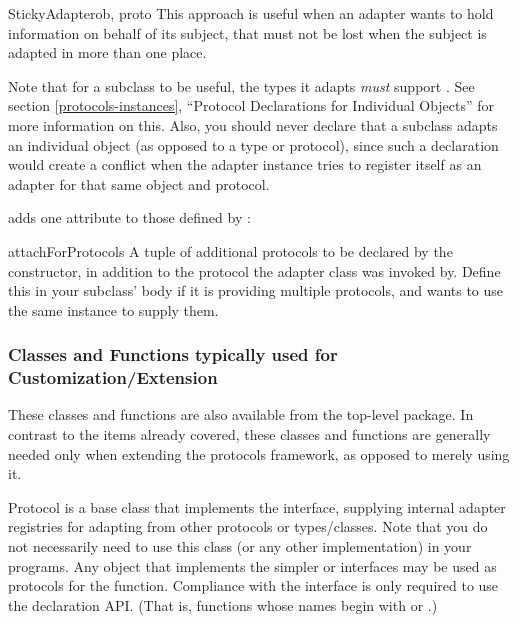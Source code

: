 \begin{verbatim%
}
\begin{verbatim%
}
\begin{verbatim%
}
\begin{verbatim%
}
\begin{verbatim%
}
\begin{verbatim%
}
\begin{classdesc}{StickyAdapter}{ob, proto}
This approach is useful when an adapter wants to hold information on behalf of
its subject, that must not be lost when the subject is adapted in
more than one place.

Note that for a  subclass to be useful, the types it
adapts \emph{must} support .  See section
\ref{protocols-instances}, ``Protocol Declarations for Individual Objects'' for
more information on this.  Also, you should never declare that a
 subclass adapts an individual object (as opposed to a
type or protocol), since such a declaration would create a conflict when the
adapter instance tries to register itself as an adapter for that same object
and protocol.

 adds one attribute to those defined by :

\begin{memberdesc}{attachForProtocols}
A tuple of additional protocols to be declared by the constructor, in
addition to the protocol the adapter class was invoked by.  Define this in
your subclass' body if it is providing multiple protocols, and wants to
use the same instance to supply them.
\end{memberdesc}

\end{classdesc}









\newpage
\subsubsection{Classes and Functions typically used for Customization/Extension}

These classes and functions are also available from the top-level
 package.  In contrast to the items already covered, these
classes and functions are generally needed only when extending the protocols
framework, as opposed to merely using it.

\begin{classdesc*}{Protocol}
 is a base class that implements the 
interface, supplying internal adapter registries for adapting from other
protocols or types/classes.  Note that you do not necessarily need to use this
class (or any other  implementation) in
your programs.  Any object that implements the simpler  or
 interfaces may be used as protocols for the
 function.  Compliance with the 
interface is only required to use the  declaration API.
(That is, functions whose names begin with  or .)


\end{classdesc*}
\end{verbatim%
}
\end{verbatim%
}
\end{verbatim%
}
\end{verbatim%
}
\end{verbatim%
}
\end{verbatim%
}
